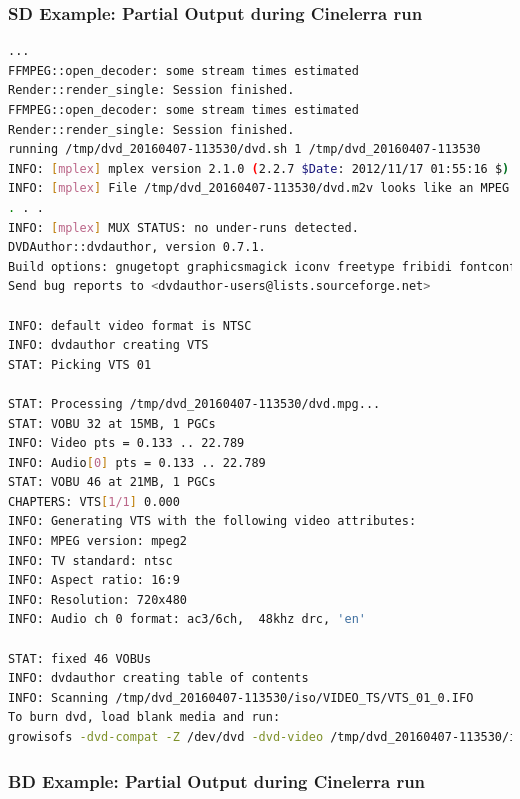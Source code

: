 \subsubsection*{SD Example: Partial Output during Cinelerra run}
\label{ssub:sd_example_partial_output}

\begin{lstlisting}[language=bash,numbers=none]
...
FFMPEG::open_decoder: some stream times estimated
Render::render_single: Session finished.
FFMPEG::open_decoder: some stream times estimated
Render::render_single: Session finished.
running /tmp/dvd_20160407-113530/dvd.sh 1 /tmp/dvd_20160407-113530
INFO: [mplex] mplex version 2.1.0 (2.2.7 $Date: 2012/11/17 01:55:16 $)
INFO: [mplex] File /tmp/dvd_20160407-113530/dvd.m2v looks like an MPEG Video stream.
. . .
INFO: [mplex] MUX STATUS: no under-runs detected.
DVDAuthor::dvdauthor, version 0.7.1. 
Build options: gnugetopt graphicsmagick iconv freetype fribidi fontconfig
Send bug reports to <dvdauthor-users@lists.sourceforge.net>

INFO: default video format is NTSC
INFO: dvdauthor creating VTS
STAT: Picking VTS 01

STAT: Processing /tmp/dvd_20160407-113530/dvd.mpg...
STAT: VOBU 32 at 15MB, 1 PGCs
INFO: Video pts = 0.133 .. 22.789
INFO: Audio[0] pts = 0.133 .. 22.789
STAT: VOBU 46 at 21MB, 1 PGCs
CHAPTERS: VTS[1/1] 0.000
INFO: Generating VTS with the following video attributes:
INFO: MPEG version: mpeg2
INFO: TV standard: ntsc
INFO: Aspect ratio: 16:9
INFO: Resolution: 720x480
INFO: Audio ch 0 format: ac3/6ch,  48khz drc, 'en'

STAT: fixed 46 VOBUs                         
INFO: dvdauthor creating table of contents
INFO: Scanning /tmp/dvd_20160407-113530/iso/VIDEO_TS/VTS_01_0.IFO
To burn dvd, load blank media and run:
growisofs -dvd-compat -Z /dev/dvd -dvd-video /tmp/dvd_20160407-113530/iso
\end{lstlisting}

\subsubsection*{BD Example: Partial Output during Cinelerra run}
\label{ssub:bd_example_partial_output}

